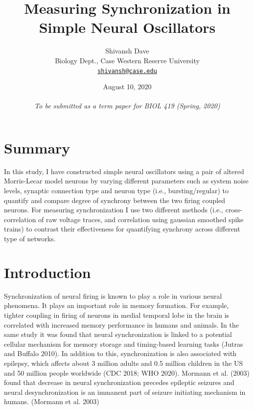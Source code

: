 \documentclass[
]{article}
\title{Measuring Synchronization in Simple Neural Oscillators}
\author{Shivansh Dave\\
Biology Dept., Case Western Reserve University\\
\href{mailto:shivansh@case.edu}{\nolinkurl{shivansh@case.edu}}}
\date{August 10, 2020\\
~\\
\emph{To be submitted as a term paper for BIOL 419 (Spring, 2020)}}
\begin{document}
\maketitle

{
\setcounter{tocdepth}{2}
\tableofcontents
}
\newpage
{}

\hypertarget{summary}{%
\section*{Summary}\label{summary}}

In this study, I have constructed simple neural oscillators using a pair of altered Morris-Lecar model neurons by varying different parameters such as system noise levels, synaptic connection type and neuron type (i.e., bursting/regular) to quantify and compare degree of synchrony between the two firing coupled neurons. For measuring synchronization I use two different methods (i.e., cross-correlation of raw voltage traces, and correlation using gaussian smoothed spike trains) to contrast their effectiveness for quantifying synchrony across different type of networks.

\hypertarget{introduction}{%
\section{Introduction}\label{introduction}}

Synchronization of neural firing is known to play a role in various neural phenomena. It plays an important role in memory formation. For example, tighter coupling in firing of neurons in medial temporal lobe in the brain is correlated with increased memory performance in humans and animals. In the same study it was found that neural synchronization is linked to a potential cellular mechanism for memory storage and timing-based learning tasks (Jutras and Buffalo 2010). In addition to this, synchronization is also associated with epilepsy, which affects about 3 million adults and 0.5 million children in the US and 50 million people worldwide (CDC 2018; WHO 2020). Mormann et al. (2003) found that decrease in neural synchronization precedes epileptic seizures and neural desynchronization is an immanent part of seizure initiating mechanism in humans. (Mormann et al. 2003)
\end{document}
